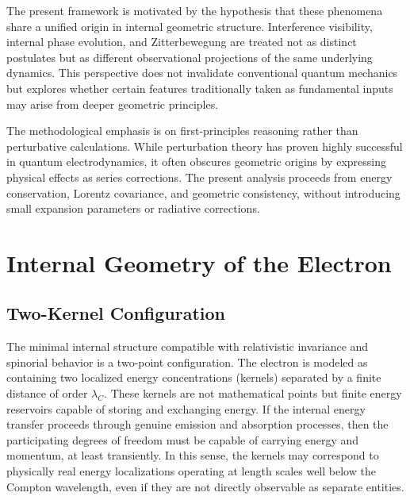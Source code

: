 \documentclass[%
 reprint,
 amsmath,amssymb,
 aps,
 prb,
]{revtex4-2}
\numberwithin{equation}{section}
\begin{document}
The present framework is motivated by the hypothesis that these phenomena share a unified origin in internal geometric structure. Interference visibility, internal phase evolution, and Zitterbewegung are treated not as distinct postulates but as different observational projections of the same underlying dynamics. This perspective does not invalidate conventional quantum mechanics but explores whether certain features traditionally taken as fundamental inputs may arise from deeper geometric principles.

The methodological emphasis is on first-principles reasoning rather than perturbative calculations. While perturbation theory has proven highly successful in quantum electrodynamics, it often obscures geometric origins by expressing physical effects as series corrections. The present analysis proceeds from energy conservation, Lorentz covariance, and geometric consistency, without introducing small expansion parameters or radiative corrections.


\section{Internal Geometry of the Electron}
\label{sec:internal_geometry}

\subsection{Two-Kernel Configuration}
\label{subsec:two_kernel}

The minimal internal structure compatible with relativistic invariance and spinorial behavior is a two-point configuration. The electron is modeled as containing two localized energy concentrations (kernels) separated by a finite distance of order $\lambda_C$. These kernels are not mathematical points but finite energy reservoirs capable of storing and exchanging energy. If the internal energy transfer proceeds through genuine emission and absorption processes, then the participating degrees of freedom must be capable of carrying energy and momentum, at least transiently. In this sense, the kernels may correspond to physically real energy localizations operating at length scales well below the Compton wavelength, even if they are not directly observable as separate entities.
\end{document}
